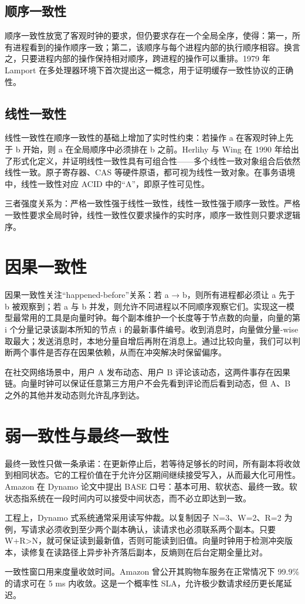 \section{顺序一致性}
顺序一致性放宽了客观时钟的要求，但仍要求存在一个全局全序，使得：第一，所有进程看到的操作顺序一致；第二，该顺序与每个进程内部的执行顺序相容。换言之，只要进程内部的操作保持相对顺序，跨进程的操作可以重排。1979 年 Lamport 在多处理器环境下首次提出这一概念，用于证明缓存一致性协议的正确性。\par
\section{线性一致性}
线性一致性在顺序一致性的基础上增加了实时性约束：若操作 a 在客观时钟上先于 b 开始，则 a 在全局顺序中必须排在 b 之前。Herlihy 与 Wing 在 1990 年给出了形式化定义，并证明线性一致性具有可组合性——多个线性一致对象组合后依然线性一致。原子寄存器、CAS 等硬件原语，都可视为线性一致对象。在事务语境中，线性一致性对应 ACID 中的“A”，即原子性可见性。\par
三者强度关系为：严格一致性强于线性一致性，线性一致性强于顺序一致性。严格一致性要求全局时钟，线性一致性仅要求操作的实时序，顺序一致性则只要求逻辑序。\par
\chapter{因果一致性}
因果一致性关注“happened-before”关系：若 a → b，则所有进程都必须让 a 先于 b 被观察到；若 a 与 b 并发，则允许不同进程以不同顺序观察它们。实现这一模型最常用的工具是向量时钟。每个副本维护一个长度等于节点数的向量，向量的第 i 个分量记录该副本所知的节点 i 的最新事件编号。收到消息时，向量做分量-wise 取最大；发送消息时，本地分量自增后再附在消息上。通过比较向量，我们可以判断两个事件是否存在因果依赖，从而在冲突解决时保留偏序。\par
在社交网络场景中，用户 A 发布动态、用户 B 评论该动态，这两件事存在因果链。向量时钟可以保证任意第三方用户不会先看到评论而后看到动态，但 A、B 之外的其他并发动态则允许乱序到达。\par
\chapter{弱一致性与最终一致性}
最终一致性只做一条承诺：在更新停止后，若等待足够长的时间，所有副本将收敛到相同状态。它的工程价值在于允许分区期间继续接受写入，从而最大化可用性。Amazon 在 Dynamo 论文中提出 BASE 口号：基本可用、软状态、最终一致。软状态指系统在一段时间内可以接受中间状态，而不必立即达到一致。\par
工程上，Dynamo 式系统通常采用读写仲裁。以复制因子 N=3、W=2、R=2 为例，写请求必须收到至少两个副本确认，读请求也必须联系两个副本。只要 W+R>N，就可保证读到最新值，否则可能读到旧值。向量时钟用于检测冲突版本，读修复在读路径上异步补齐落后副本，反熵则在后台定期全量比对。\par
一致性窗口用来度量收敛时间。Amazon 曾公开其购物车服务在正常情况下 99.9\%{} 的请求可在 5 ms 内收敛。这是一个概率性 SLA，允许极少数请求经历更长尾延迟。\par
